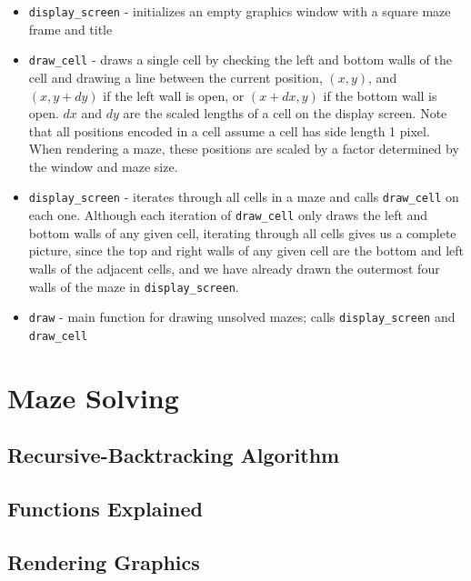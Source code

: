 \documentclass[11pt, margin=1in]{article}
\begin{document}
\begin{itemize}
\item \texttt{display_screen} - initializes an empty graphics window with a square maze frame and title
\item \texttt{draw_cell} - draws a single cell by checking the left and bottom walls of the cell and drawing a line between the current position, $(x, y)$, and $(x, y + dy)$ if the left wall is open, or $(x + dx, y)$ if the bottom wall is open. $dx$ and $dy$ are the scaled lengths of a cell on the display screen. Note that all positions encoded in a cell assume a cell has side length 1 pixel. When rendering a maze, these positions are scaled by a factor determined by the window and maze size.
\item \texttt{display_screen} - iterates through all cells in a maze and calls \texttt{draw_cell} on each one. Although each iteration of \texttt{draw_cell} only draws the left and bottom walls of any given cell, iterating through all cells gives us a complete picture, since the top and right walls of any given cell are the bottom and left walls of the adjacent cells, and we have already drawn the outermost four walls of the maze in \texttt{display_screen}. 
\item \texttt{draw} - main function for drawing unsolved mazes; calls \texttt{display_screen} and \texttt{draw_cell}
\end{itemize} 

\section{Maze Solving} 

\subsection{Recursive-Backtracking Algorithm} %

\subsection{Functions Explained} %

\subsection{Rendering Graphics} %
\end{document}
